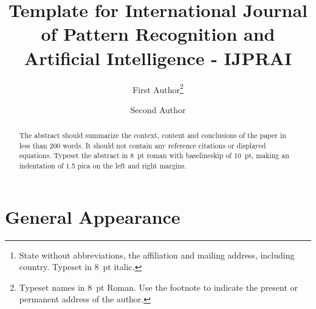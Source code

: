 \documentclass{ws-ijprai}
\begin{document}

%
\catchline{}{}{}{}{}
%
\title{Template for International Journal of Pattern Recognition and Artificial Intelligence - IJPRAI}

\author{First Author\footnote{Typeset names in 8~pt Roman.
Use the footnote to indicate the present or permanent
address of the author.}}

\address{University Department, University Name, Address\\
City, State ZIP/Zone,Country\,\footnote{State without abbreviations,
the affiliation and mailing address, including country.
Typeset in 8~pt italic.}\\
}

\author{Second Author}

\address{Group, Laboratory, Address\\
City, State ZIP/Zone, Country\\
author\_id@domain\_name}

\maketitle


\begin{abstract}
The abstract should summarize the context, content
and conclusions of the paper in less than 200 words. It should
not contain any reference citations or displayed equations. Typeset the
abstract in 8~pt roman with baselineskip of 10~pt, making
an indentation of 1.5 pica on the left and right margins.
\end{abstract}


\section{General Appearance}
\end{document}
